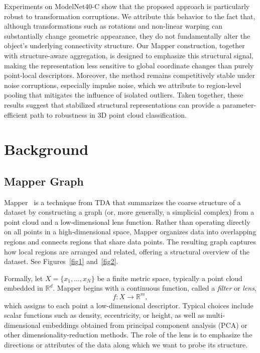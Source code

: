 \documentclass{article}
\begin{document}
Experiments on ModelNet40-C show that the proposed approach is particularly robust to transformation corruptions. We attribute this behavior to the fact that, although transformations such as rotations and non-linear warping can substantially change geometric appearance, they do not fundamentally alter the object’s underlying connectivity structure. Our Mapper construction, together with structure-aware aggregation, is designed to emphasize this structural signal, making the representation less sensitive to global coordinate changes than purely point-local descriptors. Moreover, the method remains competitively stable under noise corruptions, especially impulse noise, which we attribute to region-level pooling that mitigates the influence of isolated outliers. Taken together, these results suggest that stabilized structural representations can provide a parameter-efficient path to robustness in 3D point cloud classification.

\section{Background} \label{sec:Background}
\subsection{Mapper Graph}

Mapper~\cite{mapper2007} is a technique from TDA that summarizes the coarse structure of a dataset by constructing a graph (or, more generally, a simplicial complex) from a point cloud and a low‑dimensional lens function.
Rather than operating directly on all points in a high‑dimensional space, Mapper organizes data into overlapping regions and connects regions that share data points. 
The resulting graph captures how local regions are arranged and related, offering a structural overview of the dataset. See Figures~\ref{fig1} and~\ref{fig2}.

Formally, let $X\! =\! \{x_1,\dots,x_N\}$ be a finite metric space, typically a point cloud embedded in $\mathbb{R}^d$.
Mapper begins with a continuous function, called a \emph{filter} or \emph{lens},
$$ f : X \longrightarrow \mathbb{R}^m, $$
which assigns to each point a low-dimensional descriptor.
Typical choices include scalar functions such as density, eccentricity, or height, as well as multi-dimensional embeddings obtained from principal component analysis (PCA) or other dimensionality-reduction methods. 
The role of the lens is to emphasize the directions or attributes of the data along which we want to probe its structure.
\end{document}
